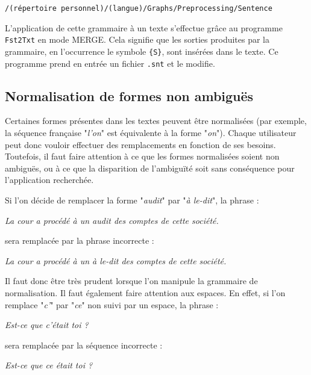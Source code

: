 \bigskip
\verb+/(répertoire personnel)/(langue)/Graphs/Preprocessing/Sentence+

\bigskip
\noindent L’application de cette grammaire à un texte s’effectue grâce au programme \verb+Fst2Txt+
 en mode MERGE. 
Cela signifie que les sorties produites par la grammaire, en l’occurrence le symbole \verb+{S}+,
sont insérées dans le texte. Ce programme prend en entrée un fichier \verb+.snt+ et le modifie.


\subsection{Normalisation de formes non ambiguës}

Certaines formes présentes dans les textes peuvent être normalisées (par exemple, la séquence
française "\textit{l'on}" est équivalente à la forme "\textit{on}"). Chaque utilisateur peut donc
vouloir effectuer des remplacements en fonction de ses besoins. Toutefois, il faut faire
attention à ce que les formes normalisées soient non ambiguës, ou à ce que la disparition de
l’ambiguïté soit sans conséquence pour l’application recherchée.


\bigskip
\noindent Si l’on décide de remplacer la forme "\textit{audit}" par "\textit{à le-dit}",
 la phrase :

\bigskip
\textit{La cour a procédé à un audit des comptes de cette société.}

\bigskip
\noindent sera remplacée par la phrase incorrecte :

\bigskip
\textit{La cour a procédé à un à le-dit des comptes de cette société.}

\bigskip
\noindent Il faut donc être très prudent lorsque l’on manipule la grammaire de normalisation.
Il faut également faire attention aux espaces.
En effet, si l’on remplace "\textit{c’}" par "\textit{ce}" non suivi par un espace, la phrase :


\bigskip
\textit{Est-ce que c’était toi ?}

\bigskip
\noindent sera remplacée par la séquence incorrecte :

\bigskip
\textit{Est-ce que ce était toi ?}


